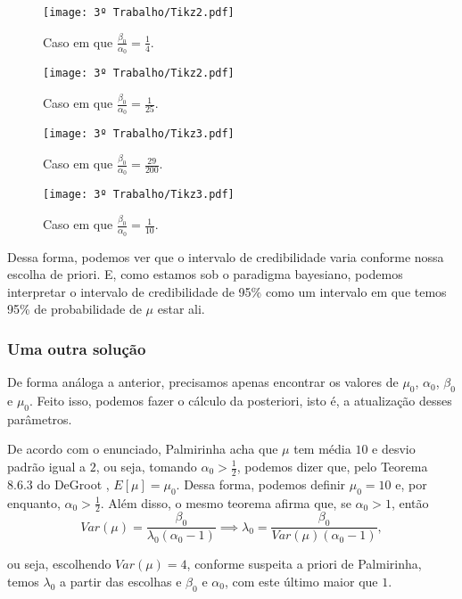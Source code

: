 \documentclass{article}
\begin{document}
\begin{multicols}{2}
    \begin{figure}[H]
        \texttt{[image: 3º Trabalho/Tikz2.pdf]}
        \caption{Caso em que $\frac{\beta_0}{\alpha_0} = \frac{1}{4}$.}
    \end{figure}
    \begin{figure}[H]
        \texttt{[image: 3º Trabalho/Tikz2.pdf]}
        \caption{Caso em que $\frac{\beta_0}{\alpha_0} = \frac{1}{25}$.}
    \end{figure}
    \begin{figure}[H]
        \texttt{[image: 3º Trabalho/Tikz3.pdf]}
        \caption{Caso em que $\frac{\beta_0}{\alpha_0} = \frac{29}{200}$.}
    \end{figure}
    \begin{figure}[H]
        \texttt{[image: 3º Trabalho/Tikz3.pdf]}
        \caption{Caso em que $\frac{\beta_0}{\alpha_0} = \frac{1}{10}$.}
    \end{figure}
\end{multicols}

Dessa forma, podemos ver que o intervalo de credibilidade varia conforme nossa escolha de priori. E, como estamos sob o paradigma bayesiano, podemos interpretar o intervalo de credibilidade de 95\% como um intervalo em que temos 95\% de probabilidade de $\mu$ estar ali.

\subsubsection*{Uma outra solução}

De forma análoga a anterior, precisamos apenas encontrar os valores de $\mu_0$, $\alpha_0$, $\beta_0$ e $\mu_0$. Feito isso, podemos fazer o cálculo da posteriori, isto é, a atualização desses parâmetros.

De acordo com o enunciado, Palmirinha acha que $\mu$ tem média $10$ e desvio padrão igual a $2$, ou seja, tomando $\alpha_0 > \frac{1}{2}$, podemos dizer que, pelo Teorema 8.6.3 do DeGroot \cite{degroot}, $E[\mu] = \mu_0$. Dessa forma, podemos definir $\mu_0 = 10$ e, por enquanto, $\alpha_0 > \frac{1}{2}$. Além disso, o mesmo teorema afirma que, se $\alpha_0 > 1$, então
\[Var(\mu) = \dfrac{\beta_0}{\lambda_0 \left(\alpha_0 - 1\right)} \implies \lambda_0 = \dfrac{\beta_0}{Var(\mu) \left(\alpha_0 - 1\right)},\]

\noindent ou seja, escolhendo $Var(\mu) = 4$, conforme suspeita a priori de Palmirinha, temos $\lambda_0$ a partir das escolhas e $\beta_0$ e $\alpha_0$, com este último maior que $1$.
\end{document}
